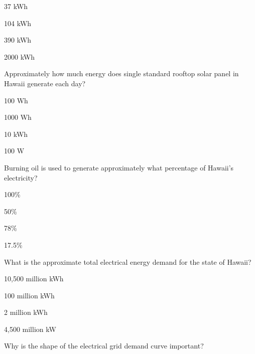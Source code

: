 \documentclass[11pt]{article}
\begin{document}
\begin{answer}
	\item 37 kWh
	\item 104 kWh
	\item 390 kWh
	\item 2000 kWh
\end{answer}

\begin{question}
	\item Approximately how much energy does single standard rooftop solar panel in Hawaii generate each day?
\end{question}

\begin{answer}
	\item 100 Wh
	\item 1000 Wh
	\item 10 kWh
	\item 100 W
\end{answer}

\pagebreak

\begin{question}
	\item Burning oil is used to generate approximately what percentage of Hawaii's electricity?
\end{question}

\begin{answer}
	\item 100\%
	\item 50\%
	\item 78\%
	\item 17.5\%
\end{answer}

\begin{question}
	\item What is the approximate total electrical energy demand for the state of Hawaii?
\end{question}

\begin{answer}
	\item 10,500 million kWh
	\item 100 million kWh
	\item 2 million kWh
	\item 4,500 million kW
\end{answer}

\begin{question}
	\item Why is the shape of the electrical grid demand curve important?
\end{question}
\end{document}
